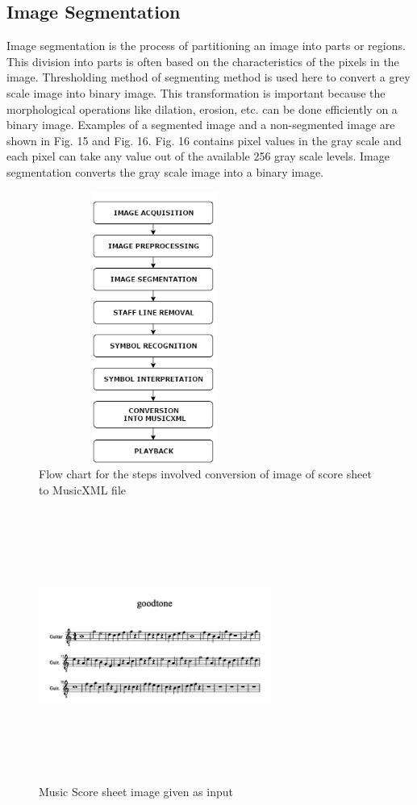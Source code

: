 \documentclass[journal]{IEEEtran}
\begin{document}
\subsection{Image Segmentation}
Image segmentation is the process of partitioning an image into parts or regions. This division into parts is often based on the characteristics of the pixels in the image. Thresholding method of segmenting method is used here to convert a grey scale image into binary image. This transformation is important because the morphological operations like dilation, erosion, etc. can be done efficiently on a binary image. Examples of a segmented image and a non-segmented image are shown in Fig. 15 and Fig. 16. Fig. 16 contains pixel values in the gray scale and each pixel can take any value out of the available 256 gray scale levels. Image segmentation converts the gray scale image into a binary image. 

\begin{figure}
\includegraphics[width=3in,height=3.5in,clip,keepaspectratio]{resources/flowchart/flowchart}
\centering
\caption{Flow chart for the steps involved conversion of image of score sheet to MusicXML file}
\end{figure}

\begin{figure}
\includegraphics[width=3in,height=3.5in,clip,keepaspectratio]{resources/implementation/good_tone}
\centering
\caption{Music Score sheet image given as input}
\end{figure}
\end{document}
